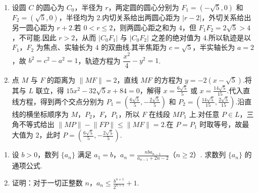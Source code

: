 \begin{solution}
\begin{enumerate}
\item 设圆 \(C\) 的圆心为 \(C_0\)，半径为 \(r\)，两定圆的圆心分别为 \(F_1=(-\sqrt5,0)\) 和 \(F_2=(\sqrt5,0)\)，半径均为 \(2\).内切关系给出两圆心距为 \(\lvert r-2\rvert\)，外切关系给出另一圆心距为 \(r+2\).若 \(0<r\leqslant2\)，则两圆心距之和为 \(4\)，但 \(F_1F_2=2\sqrt5>4\)，不可能.因此 \(r>2\)，从而 \(\bigl\lvert C_0F_1\bigr\rvert\) 与 \(\bigl\lvert C_0F_2\bigr\rvert\) 之差的绝对值为 \(4\).所以轨迹是以 \(F_1\)，\(F_2\) 为焦点、实轴长为 \(4\) 的双曲线.其半焦距为 \(c=\sqrt5\)，半实轴长为 \(a=2\)，故 \(b^2=c^2-a^2=1\)，轨迹方程为 \(\dfrac{x^2}{4}-y^2=1\).
\item 点 \(M\) 与 \(F\) 的距离为 \(\lVert MF\rVert=2\)，直线 \(MF\) 的方程为 \(y=-2(x-\sqrt5)\).将其与 \(L\) 联立，得 \(15x^2-32\sqrt5x+84=0\)，解得 \(x=\frac{6\sqrt5}{5}\) 或 \(x=\frac{14\sqrt5}{15}\).代入直线方程，得到两个交点分别为 \(P_1=\left(\frac{6\sqrt5}{5},-\frac{2\sqrt5}{5}\right)\) 和 \(P_2=\left(\frac{14\sqrt5}{15},\frac{2\sqrt5}{15}\right)\).沿直线的横坐标顺序为 \(M\)，\(P_2\)，\(F\)，\(P_1\)，所以 \(F\) 在线段 \(MP_1\) 上.对任意 \(P\in L\)，三角不等式给出 \(\lVert MP\rVert-\lVert FP\rVert\leqslant\lVert MF\rVert=2\).在 \(P=P_1\) 时取等号，故最大值为 \(2\)，此时 \(P=\left(\frac{6\sqrt5}{5},-\frac{2\sqrt5}{5}\right)\).
\end{enumerate}
\end{solution}

\begin{problem}
\begin{enumerate}
\item 设 \(b > 0\)，数列 \(\{a_{n}\}\) 满足 \(a_{1} = b\)，\(a_{n} = \frac{nba_{n-1}}{a_{n-1} + 2n - 2}\)（\(n \geqslant 2\)）. 求数列 \(\{a_{n}\}\) 的通项公式.
\item 证明：对于一切正整数 \(n\)，\(a_{n} \leqslant \frac{b^{n+1}}{2^{n+1}} + 1\).
\end{enumerate}
\end{problem}

